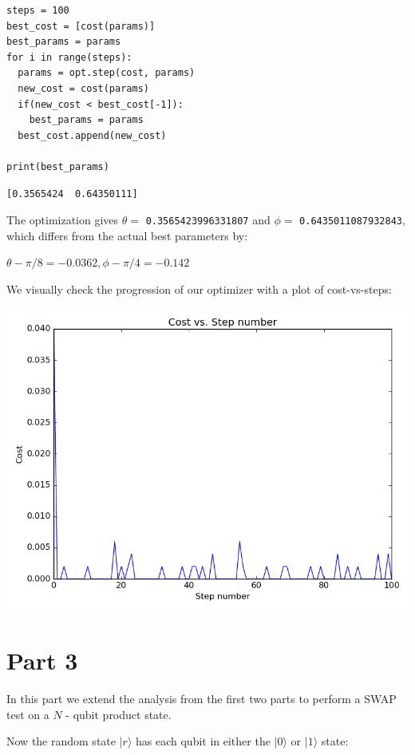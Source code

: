 \documentclass[11pt]{article}
\begin{document}
\begin{verbatim}
steps = 100
best_cost = [cost(params)]
best_params = params
for i in range(steps):
  params = opt.step(cost, params)
  new_cost = cost(params)
  if(new_cost < best_cost[-1]):
    best_params = params
  best_cost.append(new_cost)

print(best_params)
\end{verbatim}

\begin{verbatim}
[0.3565424  0.64350111]
\end{verbatim}


The optimization gives \(\theta =\) \texttt{0.3565423996331807} and \(\phi =\) \texttt{0.6435011087932843}, which differs from the actual best parameters by:

$\theta - \pi/8 = -0.0362, \phi - \pi/4 = -0.142$


\pagebreak

We visually check the progression of our optimizer with a plot of cost-vs-steps:

\begin{center}
\includegraphics[width=.9\linewidth]{images/rotosolve.png}
\end{center}


\section{Part 3}
\label{sec:orgd93e65c}

In this part we extend the analysis from the first two parts to perform a SWAP test on a \(N\) - qubit product state.

Now the random state \(|r\rangle\) has each qubit in either the \(|0\rangle\) or \(|1\rangle\) state:
\end{document}
